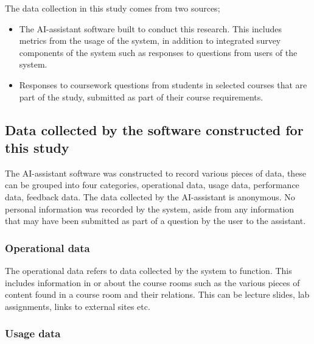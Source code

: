 

The data collection in this study comes from two sources;


\begin{itemize}
        \item The AI-assistant software built to conduct this research. This includes metrics from the usage of the system, in addition to integrated survey components of the system such as responses to questions from users of the system.
        \item Responses to coursework questions from students in selected courses that are part of the study, submitted as part of their course requirements.
\end{itemize}


\subsection{Data collected by the software constructed for this study}


The AI-assistant software was constructed to record various pieces of data, these can be grouped into four categories, operational data, usage data, performance data, feedback data. The data collected by the AI-assistant is anonymous. No personal information was recorded by the system, aside from any information that may have been submitted as part of a question by the user to the assistant.


\subsubsection{Operational data}


The operational data refers to data collected by the system to function. This includes information in or about the course rooms such as the various pieces of content found in a course room and their relations. This can be lecture slides, lab assignments, links to external sites etc.


\subsubsection{Usage data}


